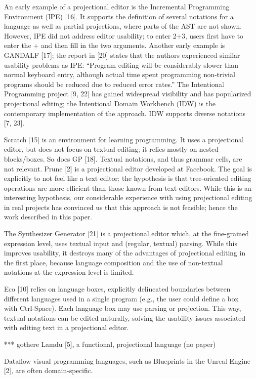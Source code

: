 An early example of a projectional editor is the Incremental Programming Environment (IPE) [16].
It supports the definition of several notations for a language as well as partial projections, where parts of the AST are not shown.
However, IPE did not address editor usability; to enter 2+3, users first have to enter the + and then fill in the two arguments.
Another early example is GANDALF [17]; the report in [20] states that the authors experienced similar usability problems as IPE: “Program editing will be considerably slower than normal keyboard entry, although actual time spent programming non-trivial programs should be reduced due to reduced error rates.”
The Intentional Programming project [9, 22] has gained widespread visibility and has popularized projectional editing; the Intentional Domain Workbench (IDW) is the contemporary implementation of the approach.
IDW supports diverse notations [7, 23].

Scratch [15] is an environment for learning programming.
It uses a projectional editor, but does not focus on textual editing; it relies mostly on nested blocks/boxes.
So does GP [18].
Textual notations, and thus grammar cells, are not relevant.
Prune [2] is a projectional editor developed at Facebook.
The goal is explicitly to not feel like a text editor; the hypothesis is that tree-oriented editing operations are more efficient than those known from text editors.
While this is an interesting hypothesis, our considerable experience with using projectional editing in real projects has convinced us that this approach is not feasible; hence the work described in this paper.

The Synthesizer Generator [21] is a projectional editor which, at the fine-grained expression level, uses textual input and (regular, textual) parsing.
While this improves usability, it destroys many of the advantages of projectional editing in the first place, because language composition and the use of non-textual notations at the expression level is limited.

Eco [10] relies on language boxes, explicitly delineated boundaries between different languages used in a single program (e.g., the user could define a box with Ctrl-Space).
Each language box may use parsing or projection.
This way, textual notations can be edited naturally, solving the usability issues associated with editing text in a projectional editor.

*** gothere
Lamdu [5], a functional, projectional language (no paper)

Dataflow visual programming languages, such as Blueprints in the Unreal Engine [2], are often domain-specific.


